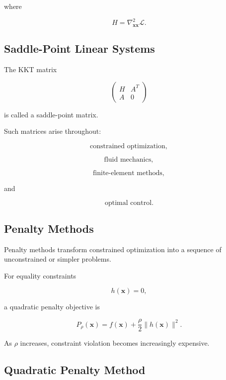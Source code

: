 where

\[
\boxed{
H
=
\nabla_{\mathbf{x}\mathbf{x}}^2\mathcal{L}.
}
\]

\subsection{Saddle-Point Linear Systems}
\label{subsec:nlp-saddle-point-system}

The KKT matrix

\[
\boxed{
\begin{pmatrix}
H&A^T\\
A&0
\end{pmatrix}
}
\]

is called a saddle-point matrix.

Such matrices arise throughout:

\[
\boxed{
\text{constrained optimization},
}
\]

\[
\boxed{
\text{fluid mechanics},
}
\]

\[
\boxed{
\text{finite-element methods},
}
\]

and

\[
\boxed{
\text{optimal control}.
}
\]

\subsection{Penalty Methods}
\label{subsec:nlp-penalty-methods}

Penalty methods transform constrained optimization into a sequence of
unconstrained or simpler problems.

For equality constraints

\[
h(\mathbf{x})=0,
\]

a quadratic penalty objective is

\[
\boxed{
P_\rho(\mathbf{x})
=
f(\mathbf{x})
+
\frac{\rho}{2}
\|
h(\mathbf{x})
\|^2.
}
\]

As \(\rho\) increases, constraint violation becomes increasingly
expensive.

\subsection{Quadratic Penalty Method}
\label{subsec:quadratic-penalty}

